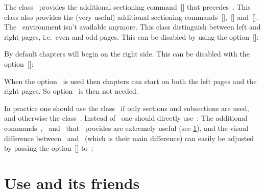 The class~ provides the additional sectioning command~[\comname] that precedes~.
This class also provides the (very useful) additional sectioning commands~[\comname],~[\comname] and~[\comname].
The~ environment isn’t available anymore.
This class distinguish between left and right pages, i.e.\ even and odd pages.
This can be disabled by using the option~[\optname]:
By default chapters will begin on the right side.
This can be disabled with the option~[\optname]:
When the option~ is used then chapters can start on both the left pages and the right pages.
So option~ is then not needed.

In practice one should use the class~ if only sections and subsections are used, and otherwise the class~.
Instead of~ one should directly use~:
The additional commands~,~ and~ that~ provides are extremely useful (see \cref{using frontmatter}), and the visual difference between~ and~ (which is their main difference) can easily be adjusted by passing the option~[\optname] to~:





\section{Use  and its friends}
\label{using frontmatter}

